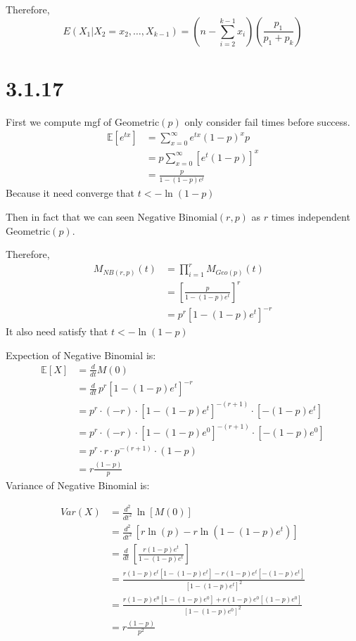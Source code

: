 \documentclass{article}
\begin{document}
\noindent
Therefore,
\[
E(X_1 | X_2 = x_2, \ldots, X_{k-1}) = 
\left( n - \sum_{i=2}^{k-1} x_i \right) \left( \frac{p_1}{p_1+p_k} \right)
\]
\section*{3.1.17}
First we compute mgf of \(\text{Geometric}(p)\) only consider fail times before success.
\begin{align*}
\mathbb{E}[e^{tx}]&=\sum_{x=0}^{\infty} e^{tx}\left(1-p\right)^x p\\
&=p\sum_{x=0}^{\infty}\left[e^t\left(1-p\right)\right]^x\\
&=\frac{p}{1-\left(1-p\right)e^t}
\end{align*}
\noindent
Because it need converge that \(t < -\ln(1-p) \)

\noindent
Then in fact that we can seen \(\text{Negative Binomial}(r, p)\) as \(r\) times independent \(\text{Geometric}(p)\).

\noindent
Therefore,
\begin{align*}
M_{NB(r,p)}(t) &= \prod_{i=1}^{r}M_{Geo(p)}(t)\\
&=\left[\frac{p}{1-\left(1-p\right)e^t}\right]^r\\
&=p^r\left[1-\left(1-p\right)e^t\right]^{-r}
\end{align*}
\noindent
It also need satisfy that \(t < -\ln(1-p) \)

\noindent
Expection of Negative Binomial is:
\begin{align*}
\mathbb{E}[X] &= \frac{d}{dt}M(0)\\
&= \frac{d}{dt} \, p^r\left[1-\left(1-p\right)e^t\right]^{-r} \\
&= p^r \cdot (-r) \cdot \left[1-\left(1-p\right)e^t\right]^{-(r+1)} \cdot [-(1-p)e^t]\\
&= p^r \cdot (-r) \cdot \left[1-\left(1-p\right)e^0\right]^{-(r+1)} \cdot [-(1-p)e^0]\\
&= p^r \cdot r \cdot p^{-(r+1)} \cdot (1-p)\\
&= r\frac{(1-p)}{p}
\end{align*}
\noindent
Variance of Negative Binomial is:

\begin{align*}
Var(X) &= \frac{d^2}{dt^2} \, \ln\left[M(0)\right]\\
&= \frac{d^2}{dt^2} \, \left[r\ln(p) - r \ln(1-(1-p)e^t)\right]\\
&= \frac{d}{dt} \, \left[ \frac{r(1-p)e^t}{1-(1-p)e^t}\right]\\
&= \frac{r(1-p)e^t[1-(1-p)e^t]-r(1-p)e^t[-(1-p)e^t]}{[1-(1-p)e^t]^2}\\
&= \frac{r(1-p)e^0[1-(1-p)e^0]+r(1-p)e^0[(1-p)e^0]}{[1-(1-p)e^0]^2}\\
&= r\frac{(1-p)}{p^2}
\end{align*}
\end{document}
